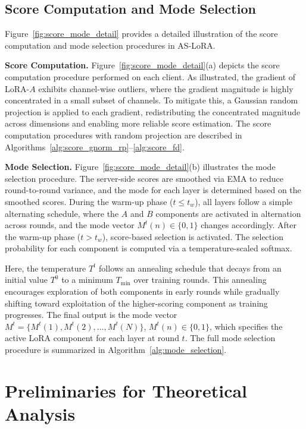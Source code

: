 \subsection{Score Computation and Mode Selection}
Figure~\ref{fig:score_mode_detail} provides a detailed illustration of the score 
computation and mode selection procedures in AS-LoRA.

\textbf{Score Computation.}
Figure~\ref{fig:score_mode_detail}(a) depicts the score computation procedure 
performed on each client.
As illustrated, the gradient of LoRA-$A$ exhibits channel-wise outliers, where 
the gradient magnitude is highly concentrated in a small subset of channels.
To mitigate this, a Gaussian random projection is applied to each gradient, 
redistributing the concentrated magnitude across dimensions and enabling more 
reliable score estimation.
The score computation procedures with random projection are described in 
Algorithms~\ref{alg:score_gnorm_rp}--\ref{alg:score_fd}.

\textbf{Mode Selection.}
Figure~\ref{fig:score_mode_detail}(b) illustrates the mode selection procedure.
The server-side scores are smoothed via EMA to reduce round-to-round variance, 
and the mode for each layer is determined based on the smoothed scores.
During the warm-up phase ($t \leq t_w$), all layers follow a simple alternating 
schedule, where the $A$ and $B$ components are activated in alternation across 
rounds, and the mode vector $M^t(n) \in \{0, 1\}$ changes accordingly.
After the warm-up phase ($t > t_w$), score-based selection is activated.
The selection probability for each component is computed via a temperature-scaled 
softmax.

Here, the temperature $T^t$ follows an annealing schedule that decays from an 
initial value $T^0$ to a minimum $T_{\min}$ over training rounds.
This annealing encourages exploration of both components in early rounds while 
gradually shifting toward exploitation of the higher-scoring component as 
training progresses.
The final output is the mode vector
$M^t = \{M^t(1), M^t(2), \ldots, M^t(N)\}$, $M^t(n) \in \{0, 1\}$,
which specifies the active LoRA component for each layer at round $t$.
The full mode selection procedure is summarized in 
Algorithm~\ref{alg:mode_selection}.

\section{Preliminaries for Theoretical Analysis}
\label{app:prelim}


